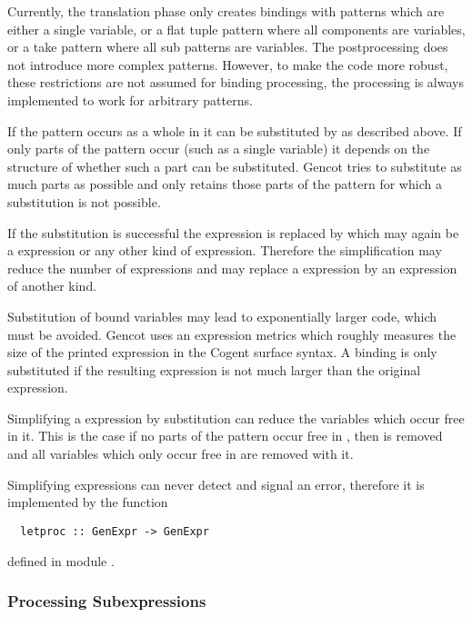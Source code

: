 Currently, the translation phase only creates bindings with patterns which are either a single variable, or a flat tuple pattern where
all components are variables, or a take pattern where all sub patterns are variables. The postprocessing does not
introduce more complex patterns. However, to make the code more robust, these restrictions are not assumed for binding processing,
the processing is always implemented to work for arbitrary patterns.

If the pattern occurs as a whole in  it can be
substituted by  as described above. If only parts of the pattern occur (such as a single variable) it depends
on the structure of  whether such a part can be substituted. Gencot tries to substitute as much parts as possible 
and only retains those parts of the pattern for which a substitution is not possible.

If the substitution is successful the  expression is replaced by  which may again be a 
expression or any other kind of expression. Therefore the simplification may reduce the number of  expressions
and may replace a  expression by an expression of another kind.

Substitution of bound variables may lead to exponentially larger code, which must be avoided. Gencot uses an expression metrics
which roughly measures the size of the printed expression in the Cogent surface syntax. A binding is only substituted if the 
resulting expression is not much larger than the original  expression.

Simplifying a  expression by substitution can reduce the variables which occur free in it. This is the case if no
parts of the pattern  occur free in , then  is removed and all variables which only occur free
in  are removed with it.

Simplifying  expressions can never detect and signal an error, therefore it is implemented by the function
\begin{verbatim}
  letproc :: GenExpr -> GenExpr
\end{verbatim}
defined in module .

\subsubsection{Processing Subexpressions}

